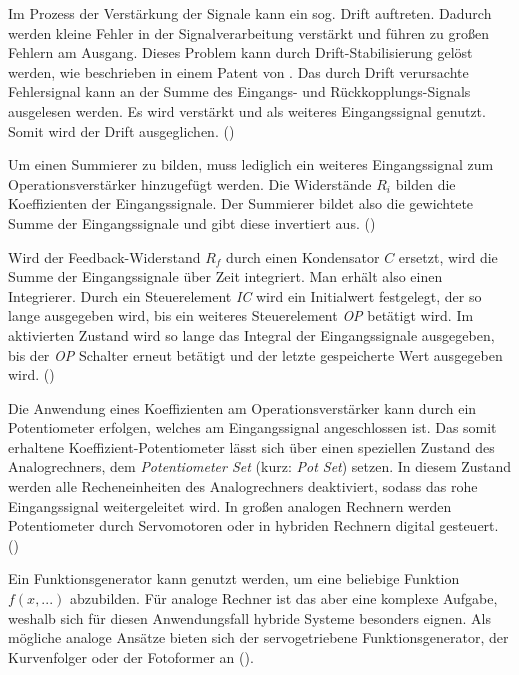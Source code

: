 Im Prozess der Verstärkung der Signale kann ein sog. Drift auftreten. Dadurch werden kleine Fehler in der Signalverarbeitung verstärkt und führen zu großen Fehlern am Ausgang. Dieses Problem kann durch Drift-Stabilisierung gelöst werden, wie beschrieben in einem Patent von \cite{Goldberg1954}. Das durch Drift verursachte Fehlersignal kann an der Summe des Eingangs- und Rückkopplungs-Signals ausgelesen werden. Es wird verstärkt und als weiteres Eingangssignal genutzt. Somit wird der Drift ausgeglichen. (\cite[vgl. S. 80]{Ulmann2022})

Um einen Summierer zu bilden, muss lediglich ein weiteres Eingangssignal zum Operationsverstärker hinzugefügt werden. Die Widerstände \(R_i\) bilden die Koeffizienten der Eingangssignale. Der Summierer bildet also die gewichtete Summe der Eingangssignale und gibt diese invertiert aus. (\cite[vgl. S. 86]{Ulmann2022})

Wird der Feedback-Widerstand \(R_f\) durch einen Kondensator \(C\) ersetzt, wird die Summe der Eingangssignale über Zeit integriert. Man erhält also einen Integrierer. Durch ein Steuerelement \textit{IC} wird ein Initialwert festgelegt, der so lange ausgegeben wird, bis ein weiteres Steuerelement \textit{OP} betätigt wird. Im aktivierten Zustand wird so lange das Integral der Eingangssignale ausgegeben, bis der \textit{OP} Schalter erneut betätigt und der letzte gespeicherte Wert ausgegeben wird. (\cite[vgl. S. 89 ff.]{Ulmann2022})

Die Anwendung eines Koeffizienten am Operationsverstärker kann durch ein Potentiometer erfolgen, welches am Eingangssignal angeschlossen ist. Das somit erhaltene Koeffizient-Potentiometer lässt sich über einen speziellen Zustand des Analogrechners, dem \textit{Potentiometer Set} (kurz: \textit{Pot Set}) setzen. In diesem Zustand werden alle Recheneinheiten des Analogrechners deaktiviert, sodass das rohe Eingangssignal weitergeleitet wird. In großen analogen Rechnern werden Potentiometer durch Servomotoren oder in hybriden Rechnern digital gesteuert. (\cite[vgl. S. 92 ff.]{Ulmann2022})

Ein Funktionsgenerator kann genutzt werden, um eine beliebige Funktion \(f(x,...)\) abzubilden. Für analoge Rechner ist das aber eine komplexe Aufgabe, weshalb sich für diesen Anwendungsfall hybride Systeme besonders eignen. Als mögliche analoge Ansätze bieten sich der servogetriebene Funktionsgenerator, der Kurvenfolger oder der Fotoformer an (\cite[vgl. S. 97 ff.]{Ulmann2022}).

